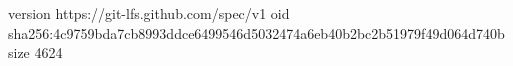 version https://git-lfs.github.com/spec/v1
oid sha256:4c9759bda7cb8993ddce6499546d5032474a6eb40b2bc2b51979f49d064d740b
size 4624
